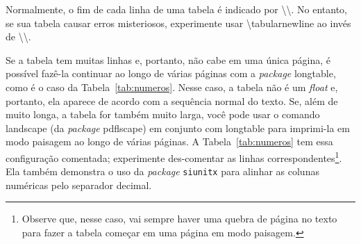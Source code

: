 Normalmente, o fim de cada linha de uma tabela é indicado por
\textsf{\textbackslash\textbackslash}. No entanto, se sua tabela causar
erros misteriosos, experimente usar \textsf{\textbackslash{}tabularnewline}
ao invés de \textsf{\textbackslash\textbackslash}.

Se a tabela tem muitas linhas e, portanto, não cabe em uma única página, é
possível fazê-la continuar ao longo de várias páginas com a \textit{package}
\textsf{longtable}, como é o caso da Tabela~\ref{tab:numeros}. Nesse caso,
a tabela não é um \textit{float} e, portanto, ela aparece de acordo com a
sequência normal do texto. Se, além de muito longa, a tabela for também
muito larga, você pode usar o comando \textsf{landscape} (da
\textit{package} \textsf{pdflscape}) em conjunto com \textsf{longtable}
para imprimi-la em modo paisagem ao longo de várias páginas. A
Tabela~\ref{tab:numeros} tem essa configuração comentada; experimente
des-comentar as linhas correspondentes\footnote{Observe que, nesse caso,
vai sempre haver uma quebra de página no texto para fazer a tabela
começar em uma página em modo paisagem.}. Ela também demonstra o uso
da \emph{package} \texttt{siunitx} para alinhar as colunas numéricas pelo
separador decimal.


\bgroup
{}

